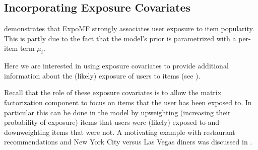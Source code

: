 \subsection{Incorporating Exposure Covariates}


 demonstrates that ExpoMF strongly associates user
exposure to item popularity. This is partly due to the fact that the
model's prior is parametrized with a per-item term $\mu_i$. 

Here we are interested in using exposure covariates to provide additional
information about the (likely) exposure of users to items (see
). 

Recall that the role of these exposure covariates
is to allow the matrix factorization component to focus
 on items that the user has been exposed to. In particular this can be done
in the model by upweighting (increasing their probability of exposure)
items that users were (likely) exposed to and downweighting items that
were not. A motivating example with restaurant recommendations and New York
City versus Las Vegas diners was discussed in .



